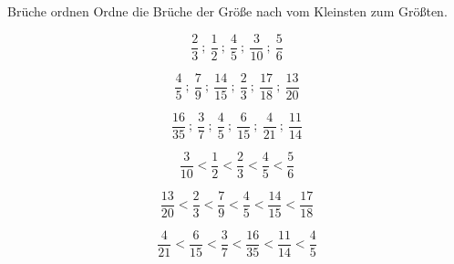 \documentclass[lerntheke,12pt,a5paper,landscape]{arbeitsblatt}
\begin{document}
	\begin{karte1}{Brüche ordnen}
		Ordne die Brüche der Größe nach vom Kleinsten zum Größten.

		\begin{enuma}
			\item \[ \frac{2}{3}\:;\ \frac{1}{2}\:;\ \frac{4}{5}\:;\ \frac{3}{10}\:;\ \frac{5}{6} \]

			\item \[ \frac{4}{5}\:;\ \frac{7}{9}\:;\ \frac{14}{15}\:;\ \frac{2}{3}\:;\ \frac{17}{18}\:;\ \frac{13}{20} \]

			\item \[ \frac{16}{35}\:;\ \frac{3}{7}\:;\ \frac{4}{5}\:;\ \frac{6}{15}\:;\ \frac{4}{21}\:;\ \frac{11}{14} \]
		\end{enuma}
	\end{karte1}

	\begin{loesungskarte}
		\begin{enuma}
			\item \[ \frac{3}{10} < \frac{1}{2} < \frac{2}{3} < \frac{4}{5} < \frac{5}{6} \]

			\item \[ \frac{13}{20} < \frac{2}{3} < \frac{7}{9} < \frac{4}{5} < \frac{14}{15} < \frac{17}{18} \]

			\item \[ \frac{4}{21} < \frac{6}{15} < \frac{3}{7} < \frac{16}{35} < \frac{11}{14} < \frac{4}{5} \]
		\end{enuma}
	\end{loesungskarte}
\end{document}
